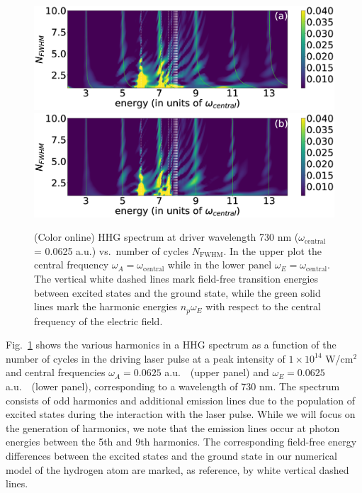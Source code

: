 \begin{figure}[t]
\centering
    \includegraphics[width=\linewidth]{figs/Frequency_shift/HHG_w_A.eps}       
    \includegraphics[width=\linewidth]{figs/Frequency_shift/HHG_w_E.eps}
\caption{(Color online)
HHG spectrum at driver wavelength 730 nm ($\omega_\text{central}$ = 0.0625 a.u.) vs.\ number of cycles $N_\text{FWHM}$. In the upper plot the central frequency $\omega_A = \omega_\text{central}$ while in the lower panel $\omega_E = \omega_\text{central}$. The vertical white dashed lines mark field-free transition energies between excited states and the ground state, while the green solid lines mark the harmonic energies $n_p\omega_E$ with respect to the central frequency of the electric field.
}
  \label{fig:HHG}
\end{figure}

Fig.~\ref{fig:HHG} shows the various harmonics in a HHG spectrum as a function of the number of cycles in the driving laser pulse at a peak intensity of $1\times 10^{14}$ W/cm$^2$ and central frequencies $\omega_A=0.0625$ a.u.\ \ (upper panel) and $\omega_E=0.0625$ a.u.\ \ (lower panel), corresponding to a wavelength of 730 nm. The spectrum consists of odd harmonics and additional emission lines due to the population of excited states during the interaction with the laser pulse. While we will focus on the generation of harmonics, we note that the emission lines occur at photon energies between the 5th and 9th harmonics. The corresponding field-free energy differences between the excited states and the ground state in our numerical model of the hydrogen atom are marked, as reference, by white vertical dashed lines.

